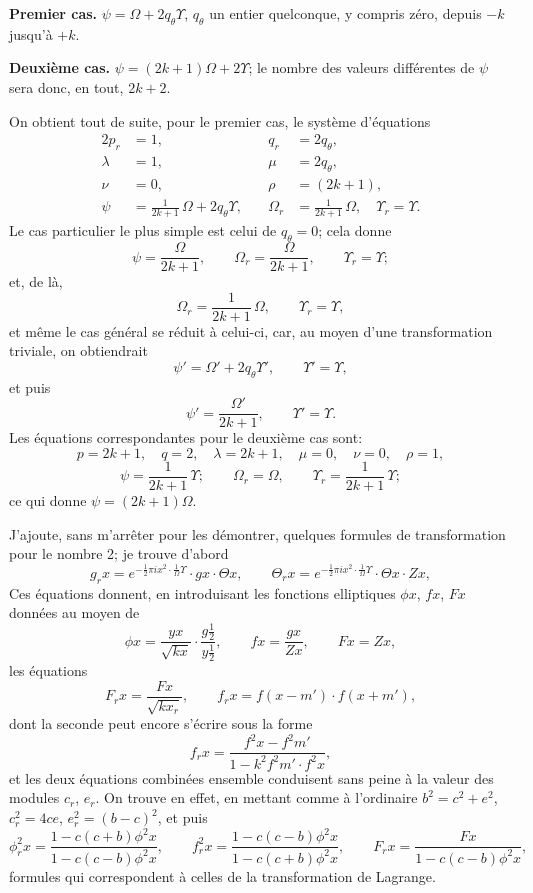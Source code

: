 \documentclass[11pt,a4paper]{book}
\begin{document}
\smallskip
\textbf{Premier cas.} $\psi = \Omega + 2q_\theta\Upsilon$, $q_\theta$ un entier
quelconque, y compris z\'ero, depuis $-k$ jusqu'\`a $+k$.

\smallskip
\textbf{Deuxi\`eme cas.} $\psi = (2k+1)\Omega + 2\Upsilon$;
le nombre des valeurs diff\'erentes de $\psi$ sera donc, en tout, $2k+2$.

\medskip

On obtient tout de suite, pour le premier cas, le syst\`eme d'\'equations
\begin{alignat*}{2}
p_r &= 1,\quad & q_r &= 2q_\theta, \\
\lambda &= 1,\quad & \mu &= 2q_\theta, \\
\nu &= 0,\quad & \rho &= (2k+1), \\
\psi &= \tfrac{1}{2k+1}\,\Omega + 2q_\theta\Upsilon,\quad &
\Omega_r &= \tfrac{1}{2k+1}\,\Omega, \quad
\Upsilon_r = \Upsilon.
\end{alignat*}
Le cas particulier le plus simple est celui de $q_\theta = 0$; cela donne
\[
\psi = \frac{\Omega}{2k+1}, \qquad
\Omega_r = \frac{\Omega}{2k+1}, \qquad
\Upsilon_r = \Upsilon;
\]
et, de l\`a,
\[
\Omega_r = \frac{1}{2k+1}\,\Omega, \qquad
\Upsilon_r = \Upsilon,
\]
et m\^eme le cas g\'en\'eral se r\'eduit \`a celui-ci, car, au moyen d'une
transformation triviale, on obtiendrait
\[
\psi' = \Omega' + 2q_\theta\Upsilon',\qquad \Upsilon' = \Upsilon,
\]
et puis
\[
\psi' = \frac{\Omega'}{2k+1},\qquad \Upsilon' = \Upsilon.
\]
Les \'equations correspondantes pour le deuxi\`eme cas sont:
\[
p=2k+1,\quad q=2,\quad
\lambda=2k+1,\quad \mu=0,\quad \nu=0,\quad \rho=1,
\]
\[
\psi = \frac{1}{2k+1}\,\Upsilon; \qquad
\Omega_r = \Omega, \qquad
\Upsilon_r = \frac{1}{2k+1}\,\Upsilon;
\]
ce qui donne $\psi = (2k+1)\Omega$.

\medskip

J'ajoute, sans m'arr\^eter pour les d\'emontrer, quelques formules de
transformation pour le nombre 2; je trouve d'abord
\[
g_r x = e^{-\frac{1}{2}\pi i x^2 \cdot \tfrac{1}{\Omega}\Upsilon}\cdot gx\cdot\Theta x,
\qquad
\Theta_r x = e^{-\frac{1}{2}\pi i x^2 \cdot \tfrac{1}{\Omega}\Upsilon}\cdot\Theta x\cdot Zx,
\]
Ces \'equations donnent, en introduisant les fonctions elliptiques
$\phi x$, $fx$, $Fx$ donn\'ees au moyen de
\[
\phi x = \frac{yx}{\sqrt{kx}}\cdot\frac{g\tfrac{1}{2}}{y\tfrac{1}{2}},\qquad
fx = \frac{gx}{Zx},\qquad
Fx = Zx,
\]
les \'equations
\[
F_r x = \frac{F x}{\sqrt{kx_r}},\qquad
f_r x = f(x-m') \cdot f(x+m'),
\]
dont la seconde peut encore s'\'ecrire sous la forme
\[
f_r x = \frac{f^2 x - f^2 m'}{1 - k^2 f^2 m' \cdot f^2 x},
\]
et les deux \'equations combin\'ees ensemble conduisent sans peine \`a la
valeur des modules $c_r$, $e_r$.
On trouve en effet, en mettant comme \`a l'ordinaire $b^2 = c^2 + e^2$,
$c_r^2 = 4ce$, $e_r^2 = (b-c)^2$, et puis
\[
\phi_r^2 x = \frac{1-c(c+b)\phi^2 x}{1-c(c-b)\phi^2 x},\qquad
f_r^2 x = \frac{1-c(c-b)\phi^2 x}{1-c(c+b)\phi^2 x},\qquad
F_r x = \frac{Fx}{1-c(c-b)\phi^2 x},
\]
formules qui correspondent \`a celles de la transformation de Lagrange.
\end{document}
